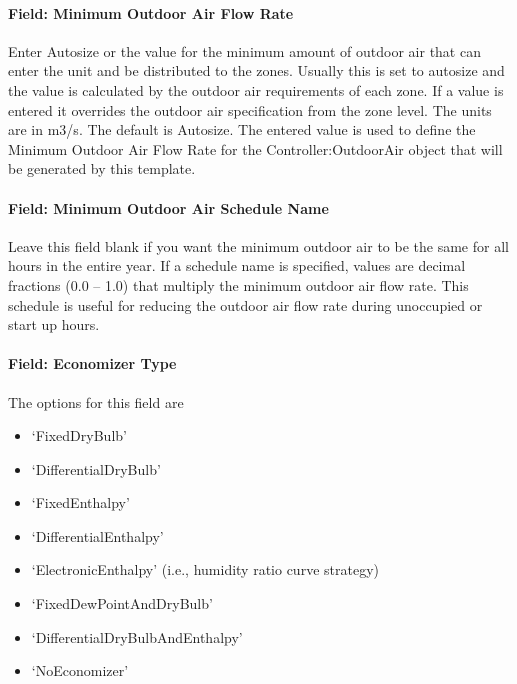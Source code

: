 \paragraph{Field: Minimum Outdoor Air Flow Rate}\label{field-minimum-outdoor-air-flow-rate-1}

Enter Autosize or the value for the minimum amount of outdoor air that can enter the unit and be distributed to the zones. Usually this is set to autosize and the value is calculated by the outdoor air requirements of each zone. If a value is entered it overrides the outdoor air specification from the zone level. The units are in m3/s. The default is Autosize. The entered value is used to define the Minimum Outdoor Air Flow Rate for the Controller:OutdoorAir object that will be generated by this template.

\paragraph{Field: Minimum Outdoor Air Schedule Name}\label{field-minimum-outdoor-air-schedule-name-1}

Leave this field blank if you want the minimum outdoor air to be the same for all hours in the entire year. If a schedule name is specified, values are decimal fractions (0.0 -- 1.0) that multiply the minimum outdoor air flow rate. This schedule is useful for reducing the outdoor air flow rate during unoccupied or start up hours.

\paragraph{Field: Economizer Type}\label{field-economizer-type-1}

The options for this field are

\begin{itemize}
\item
  `FixedDryBulb'
\item
  `DifferentialDryBulb'
\item
  `FixedEnthalpy'
\item
  `DifferentialEnthalpy'
\item
  `ElectronicEnthalpy' (i.e., humidity ratio curve strategy)
\item
  `FixedDewPointAndDryBulb'
\item
  `DifferentialDryBulbAndEnthalpy'
\item
  `NoEconomizer'
\end{itemize}

